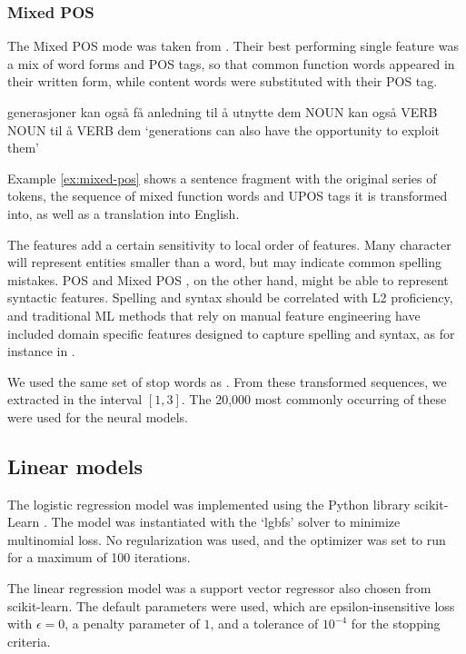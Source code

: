 \subsubsection*{Mixed POS}

The Mixed POS mode was taken from \textcite{malmasi15}. Their best performing
single feature was a mix of word forms and POS tags, so that common function
words appeared in their written form, while content words were substituted
with their POS tag.

\begin{example}
\gll generasjoner kan også få   anledning til å utnytte dem  
     NOUN         kan også VERB NOUN      til å VERB    dem  
\glt `generations can also have the opportunity to exploit them'
\glend
\label{ex:mixed-pos}
\end{example}

Example \ref{ex:mixed-pos} shows a sentence fragment with the original series
of tokens, the sequence of mixed function words and UPOS tags it is
transformed into, as well as a translation into English.

The \ngram features add a certain sensitivity to local order of features.
Many character \ngrams will represent entities smaller than a word, but may
indicate common spelling mistakes. \ac{POS} and Mixed POS \ngrams, on the
other hand, might be able to represent syntactic features. Spelling and
syntax should be correlated with L2 proficiency, and traditional \ac{ML}
methods that rely on manual feature engineering have included domain specific
features designed to capture spelling and syntax, as for instance in
\textcite{vajjala17}.

We used the same set of stop words as \citeauthor{malmasi15}. From these
transformed sequences, we extracted \ngrams in the interval $[1,3]$. The
20,000 most commonly occurring of these were used for the neural models.


\subsection{Linear models}
\label{subsec:linear}

The logistic regression model was implemented using the Python library
scikit-Learn \autocite{scikit-learn}. The model was instantiated with the
`lgbfs' solver to minimize multinomial loss. No regularization was used, and
the optimizer was set to run for a maximum of 100 iterations.

The linear regression model was a support vector regressor also chosen from
scikit-learn. The default parameters were used, which are epsilon-insensitive
loss with $\epsilon=0$, a penalty parameter of $1$, and a tolerance of
$10^{-4}$ for the stopping criteria.

